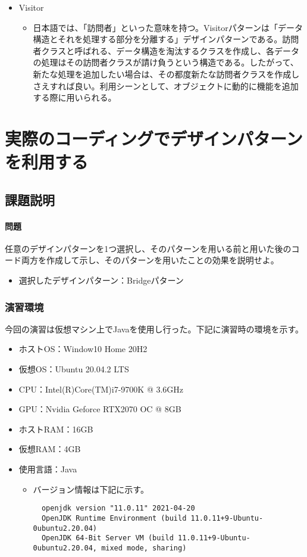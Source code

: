 \documentclass[dvipdfmx]{jsarticle}
\begin{document}
\begin{itemize}
\begin{itemize}
  \end{itemize}
  \item Visitor
  \begin{itemize}
    \item 日本語では、「訪問者」といった意味を持つ。Visitorパターンは「データ構造とそれを処理する部分を分離する」デザインパターンである。訪問者クラスと呼ばれる、データ構造を淘汰するクラスを作成し、各データの処理はその訪問者クラスが請け負うという構造である。したがって、新たな処理を追加したい場合は、その都度新たな訪問者クラスを作成しさえすれば良い。利用シーンとして、オブジェクトに動的に機能を追加する際に用いられる。
  \end{itemize}
\end{itemize}



\section{実際のコーディングでデザインパターンを利用する}
\subsection{課題説明}
\paragraph{問題} 任意のデザインパターンを1つ選択し、そのパターンを用いる前と用いた後のコード両方を作成して示し、そのパターンを用いたことの効果を説明せよ。
\begin{itemize}
  \item 選択したデザインパターン：Bridgeパターン
\end{itemize}

\subsubsection{演習環境}
今回の演習は仮想マシン上でJavaを使用し行った。下記に演習時の環境を示す。
\begin{itemize}
  \item ホストOS：Window10 Home 20H2
  \item 仮想OS：Ubuntu 20.04.2 LTS
  \item CPU：Intel(R)Core(TM)i7-9700K @ 3.6GHz
  \item GPU：Nvidia Geforce RTX2070 OC @ 8GB
  \item ホストRAM：16GB
  \item 仮想RAM：4GB
  \item 使用言語：Java
  \begin{itemize}
    \item バージョン情報は下記に示す。
    \begin{verbatim}
  openjdk version "11.0.11" 2021-04-20
  OpenJDK Runtime Environment (build 11.0.11+9-Ubuntu-0ubuntu2.20.04)
  OpenJDK 64-Bit Server VM (build 11.0.11+9-Ubuntu-0ubuntu2.20.04, mixed mode, sharing)
    \end{verbatim}
  \end{itemize}
\end{itemize}
\end{document}
